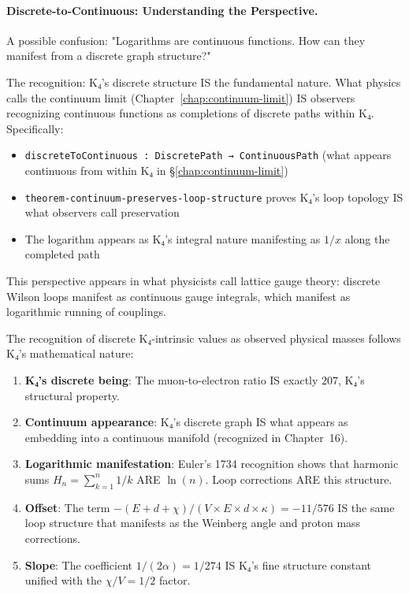 \documentclass[11pt,a4paper]{book}
\begin{document}
\paragraph{Discrete-to-Continuous: Understanding the Perspective.}

A possible confusion: "Logarithms are continuous functions. How can they manifest from a discrete graph structure?"

The recognition: K₄'s discrete structure IS the fundamental nature. What physics calls the continuum limit (Chapter~\ref{chap:continuum-limit}) IS observers recognizing continuous functions as completions of discrete paths within K₄. Specifically:

\begin{itemize}
\item \verb|discreteToContinuous : DiscretePath → ContinuousPath| (what appears continuous from within K₄ in \S\ref{chap:continuum-limit})
\item \verb|theorem-continuum-preserves-loop-structure| proves K₄'s loop topology IS what observers call preservation
\item The logarithm appears as K₄'s integral nature manifesting as $1/x$ along the completed path
\end{itemize}

This perspective appears in what physicists call lattice gauge theory: discrete Wilson loops manifest as continuous gauge integrals, which manifest as logarithmic running of couplings.

The recognition of discrete K₄-intrinsic values as observed physical masses follows K₄'s mathematical nature:

\begin{enumerate}
\item \textbf{K₄'s discrete being}: The muon-to-electron ratio IS exactly $207$, K₄'s structural property.
\item \textbf{Continuum appearance}: K₄'s discrete graph IS what appears as embedding into a continuous manifold (recognized in Chapter~16).
\item \textbf{Logarithmic manifestation}: Euler's 1734 recognition shows that harmonic sums $H_n = \sum_{k=1}^n 1/k$ ARE $\ln(n)$. Loop corrections ARE this structure.
\item \textbf{Offset}: The term $-(E + d + \chi)/(V \times E \times d \times \kappa) = -11/576$ IS the same loop structure that manifests as the Weinberg angle and proton mass corrections.
\item \textbf{Slope}: The coefficient $1/(2\alpha) = 1/274$ IS K₄'s fine structure constant unified with the $\chi/V = 1/2$ factor.
\end{enumerate}
\end{document}
